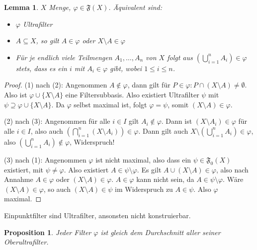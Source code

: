 \documentclass[12pt]{scrartcl}%
\newtheorem{prop}{Proposition}
\newtheorem{lemma}{Lemma}
\theoremstyle{definition}
\theoremstyle{remark}
\newcommand{\filterset}{\mathfrak{F}}
\begin{document}
\begin{lemma}
    $X$ Menge, $\varphi\in \filterset(X)$. Äquivalent sind:

    \begin{itemize}
        \item $\varphi$ Ultrafilter
        \item $A\subseteq X$, so gilt $A\in\varphi$ oder $X\setminus A\in\varphi$
        \item Für je endlich viele Teilmengen $A_1,\dots,A_n$ von $X$ folgt aus $\left(\bigcup_{i=1}^n A_i \right) \in\varphi$ stets, dass es ein $i$ mit $A_i\in\varphi$ gibt, wobei $1\leq i\leq n$.
    \end{itemize}
\end{lemma}

\begin{proof}
    (1) nach (2): Angenommen $A\not\in \varphi$, dann gilt für $P\in\varphi: P\cap (X\setminus A) \neq \emptyset$. Also ist $\varphi \cup \{X\setminus A\}$ eine Filtersubbasis. Also existiert Ultrafilter $\psi$ mit $\psi \supseteq \varphi \cup \{X\setminus A\}$. Da $\varphi$ selbst maximal ist, folgt $\varphi=\psi$, somit $(X\setminus A)\in\varphi$.

    (2) nach (3): Angenommen für alle $i\in I$ gilt $A_i\not\in\varphi$. Dann ist $(X\setminus A_i)\in\varphi$ für alle $i\in I$, also auch $\left(\bigcap_{i=1}^n (X\setminus A_i)\right) \in \varphi$. Dann gilt auch $X\setminus \left( \bigcup_{i=1}^n A_i \right) \in \varphi$, also $\left( \bigcup_{i=1}^n A_i \right) \not\in \varphi$, Widerspruch!

    (3) nach (1): Angenommen $\varphi$ ist nicht maximal, also dass ein $\psi\in\filterset_0(X)$ existiert, mit $\psi \neq \varphi$. Also existiert $A\in \psi\setminus \varphi$. Es gilt $A \cup (X\setminus A) \in \varphi$, also nach Annahme $A\in\varphi$ oder $(X\setminus A) \in \varphi$. $A\in\varphi$ kann nicht sein, da $A\in\psi\setminus\varphi$. Wäre $(X\setminus A) \in\varphi$, so auch $(X\setminus A)\in \psi$ im Widerspruch zu $A\in\psi$. Also $\varphi$ maximal.
\end{proof}

\begin{bsp}
    Einpunktfilter sind Ultrafilter, ansonsten nicht konstruierbar.
\end{bsp}

\begin{prop}
    Jeder Filter $\varphi$ ist gleich dem Durchschnitt aller seiner Oberultrafilter.
\end{prop}
\end{document}
